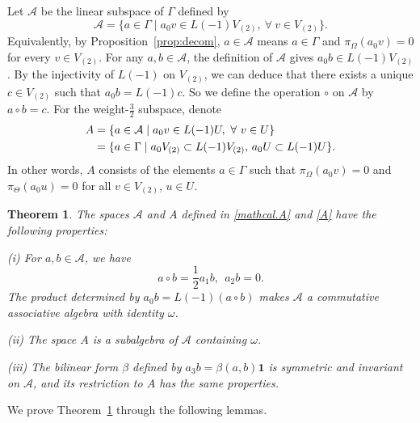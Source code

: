 \documentclass[12pt]{article}
\numberwithin{equation}{section}
\newtheorem{theorem}{Theorem}[section]
\theoremstyle{definition}
\theoremstyle{plain}
\newcommand{\subno}[1]{\noindent\textnormal{(#1)}}
\newcommand{\cA}{\ensuremath{\mathcal{A}}}
\newcommand{\bone}{\mathbf{1 }}
\begin{document}
Let $\cA$ be the linear subspace of $\Gamma$ defined by
\begin{equation}\label{mathcal.A}
    \cA=\{a\in\Gamma \mid a_0v\in L(-1)V_{(2)}, \ \forall\ v\in V_{(2)}\}.
\end{equation}
Equivalently, by Proposition~\ref{prop:decom}, $a\in\cA$ means $a\in\Gamma$ and $\pi_\Omega(a_0v)=0$ for every $v\in V_{(2)}$. For any $a,b\in\cA$, the definition of $\cA$ gives $a_0b\in L(-1)V_{(2)}$. By the injectivity of $L(-1)$ on $V_{(2)}$, we can deduce that there exists a unique $c\in V_{(2)}$ such that $a_0b=L(-1)c$. So we define the operation $\circ$ on $\cA$ by $a\circ b=c$. For the weight-$\frac32$ subspace, denote
\begin{align}
    A&=\{a\in\cA \mid a_0v\in L(-1)U,\ \forall\ v\in U\}\notag\\
        &=\{a\in\Gamma \mid  a_0V_{(2)}\subset L(-1)V_{(2)},\,a_0U\subset L(-1)U\}.\label{A}
\end{align}
In other words, $A$ consists of the elements $a\in\Gamma$ such that $\pi_\Omega(a_0v)=0$ and $\pi_\Theta(a_0u)=0$ for all $v\in V_{(2)}$, $u\in U$.


\begin{theorem}\label{thm:canonical.algebras}
The spaces $\cA$ and $A$ defined in \eqref{mathcal.A} and \eqref{A} have the following properties\textup{:}

\subno{i} For $a,b\in\cA$, we have
\begin{equation*}
    a\circ b=\frac12a_1b,\ \ a_2b=0.
\end{equation*}
The product determined by $a_0b=L(-1)(a\circ b)$ makes $\cA$ a commutative associative algebra with identity $\omega$. 

\subno{ii} The space $A$ is a subalgebra of $\cA$ containing $\omega$.

\subno{iii} The bilinear form $\beta$ defined by $a_3b=\beta(a,b)\bone$ is symmetric and invariant on $\cA$, and its restriction to $A$ has the same properties.
\end{theorem}

We prove Theorem~\ref{thm:canonical.algebras} through the following lemmas.
\end{document}
